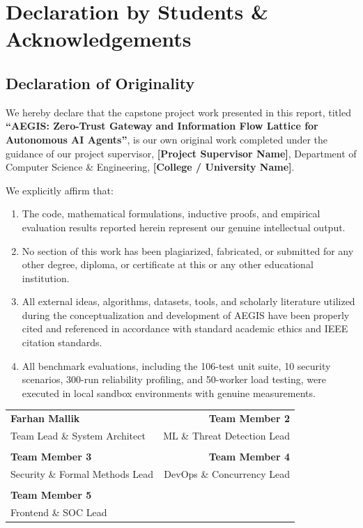 \chapter*{Declaration by Students \& Acknowledgements}

\section*{Declaration of Originality}

We hereby declare that the capstone project work presented in this report, titled \textbf{``AEGIS: Zero-Trust Gateway and Information Flow Lattice for Autonomous AI Agents''}, is our own original work completed under the guidance of our project supervisor, \textbf{[Project Supervisor Name]}, Department of Computer Science \& Engineering, \textbf{[College / University Name]}. 

We explicitly affirm that:
\begin{enumerate}
    \item The code, mathematical formulations, inductive proofs, and empirical evaluation results reported herein represent our genuine intellectual output.
    \item No section of this work has been plagiarized, fabricated, or submitted for any other degree, diploma, or certificate at this or any other educational institution.
    \item All external ideas, algorithms, datasets, tools, and scholarly literature utilized during the conceptualization and development of AEGIS have been properly cited and referenced in accordance with standard academic ethics and IEEE citation standards.
    \item All benchmark evaluations, including the 106-test unit suite, 10 security scenarios, 300-run reliability profiling, and 50-worker load testing, were executed in local sandbox environments with genuine measurements.
\end{enumerate}

\vspace{1.5cm}

\noindent
\begin{tabular*}{\textwidth}{@{\extracolsep{\fill}}lr}
\textbf{Farhan Mallik} & \textbf{Team Member 2} \\
Team Lead \& System Architect & ML \& Threat Detection Lead \\
\\
\textbf{Team Member 3} & \textbf{Team Member 4} \\
Security \& Formal Methods Lead & DevOps \& Concurrency Lead \\
\\
\textbf{Team Member 5} & \\
Frontend \& SOC Lead & \\
\end{tabular*}

